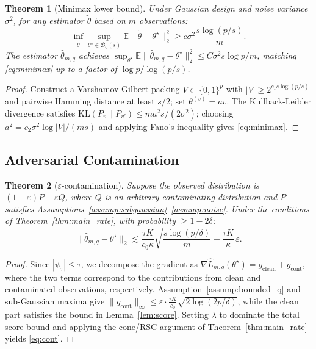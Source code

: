 \documentclass[10pt]{article}
\newtheorem{theorem}{Theorem}[section]
\newcommand{\E}{\mathbb{E}}
\newcommand{\hL}{\hat{L}}
\newcommand{\hth}{\hat{\theta}}
\newcommand{\ts}{\theta^{\star}}
\begin{document}
\begin{theorem}[Minimax lower bound]\label{thm:minimax}
Under Gaussian design and noise variance $\sigma^2$, for any estimator $\tilde\theta$ based on $m$
observations:
\begin{equation}\label{eq:minimax}
  \inf_{\tilde\theta}\sup_{\ts\in\mathcal{B}_0(s)}
  \E\|\tilde\theta-\ts\|_2^2\ge c\sigma^2\frac{s\log(p/s)}{m}.
\end{equation}
The estimator $\hth_{m,q}$ achieves $\sup_{\ts}\E\|\hth_{m,q}-\ts\|_2^2\le
C\sigma^2s\log p/m$, matching \eqref{eq:minimax} up to a factor of $\log p/\log(p/s)$.
\end{theorem}
\begin{proof}
Construct a Varshamov-Gilbert packing $V\subset\{0,1\}^p$ with $|V|\ge2^{c_1s\log(p/s)}$
and pairwise Hamming distance at least $s/2$; set $\theta^{(v)}=av$.
The Kullback-Leibler divergence satisfies
$\mathrm{KL}(P_v\|P_{v'})\le ma^2s/(2\sigma^2)$; choosing
$a^2=c_2\sigma^2\log|V|/(ms)$ and applying Fano's inequality gives \eqref{eq:minimax}.
\end{proof}

\subsection{Adversarial Contamination}
\label{subsec:cont}

\begin{theorem}[$\varepsilon$-contamination]\label{thm:cont}
Suppose the observed distribution is $(1-\varepsilon)P+\varepsilon Q$, where $Q$ is
an arbitrary contaminating distribution and $P$ satisfies
Assumptions~\ref{assump:subgaussian}--\ref{assump:noise}.
Under the conditions of Theorem~\ref{thm:main_rate}, with probability $\ge1-2\delta$:
\begin{equation}\label{eq:cont}
  \|\hth_{m,q}-\ts\|_2
  \lesssim
  \frac{\tau K}{c_0\kappa}\sqrt{\frac{s\log(p/\delta)}{m}}
  +\frac{\tau K}{\kappa}\,\varepsilon.
\end{equation}
\end{theorem}
\begin{proof}
Since $|\psi_\tau|\le\tau$, we decompose the gradient as
$\nabla\hL_{m,q}(\ts)=g_\mathrm{clean}+g_\mathrm{cont}$, where the two terms
correspond to the contributions from clean and contaminated observations,
respectively.
Assumption~\ref{assump:bounded_q} and sub-Gaussian maxima give
$\|g_\mathrm{cont}\|_\infty\le\varepsilon\cdot\frac{\tau K}{c_0}\sqrt{2\log(2p/\delta)}$,
while the clean part satisfies the bound in Lemma~\ref{lem:score}.
Setting $\lambda$ to dominate the total score bound and applying the
cone/RSC argument of Theorem~\ref{thm:main_rate} yields \eqref{eq:cont}.
\end{proof}
\end{document}
